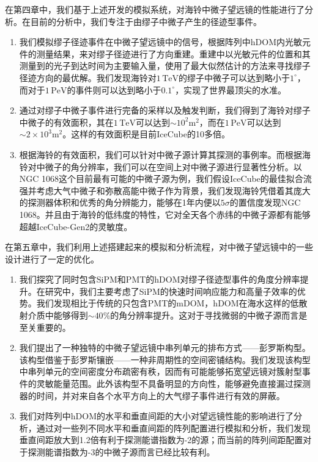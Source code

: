 在第四章中，我们基于上述开发的模拟系统，对海铃中微子望远镜的性能进行了分析。在目前的分析中，我们专注于由缪子中微子产生的径迹型事件。
\begin{enumerate}
    \item 我们模拟缪子径迹事件在中微子望远镜中的信号，根据阵列中hDOM内光敏元件的测量结果，来对缪子径迹进行了方向重建。重建中以光敏元件的位置和其测量到的光子到达时间为主要输入量，使用了最大似然估计的方法来寻找缪子径迹方向的最优解。我们发现海铃对$1\,\mathrm{TeV}$的缪子中微子可以达到略小于$1^\circ$，而对于$1\,\mathrm{PeV}$的事件则可以达到略小于$0.1^\circ$，实现了世界最顶尖的水准。
    \item 通过对缪子中微子事件进行完备的采样以及触发判断，我们得到了海铃对缪子中微子的有效面积，其在$1\,\mathrm{TeV}$可以达到$\sim 10^2 \mathrm{m^2}$，而在$1\,\mathrm{PeV}$可以达到$\sim 2 \times 10^3 \mathrm{m^2}$。这样的有效面积是目前IceCube的10多倍。
    \item 根据海铃的有效面积，我们可以针对中微子源计算其探测的事例率。而根据海铃对中微子的角分辨率，我们可以在空间上对中微子源进行显著性分析。以NGC 1068这个目前最有可能的中微子源为例，我们假设IceCube的最佳拟合流强并考虑大气中微子和弥散高能中微子作为背景，我们发现海铃凭借着其庞大的探测器体积和优秀的角分辨能力，能够在1年内便以$5\sigma$的置信度发现NGC 1068。并且由于海铃的低纬度的特性，它对全天各个赤纬的中微子源都有能够超越IceCube-Gen2的灵敏度。
\end{enumerate}

在第五章中，我们利用上述搭建起来的模拟和分析流程，对中微子望远镜中的一些设计进行了一定的优化。
\begin{enumerate}
    \item 我们探究了同时包含SiPM和PMT的hDOM对缪子径迹型事件的角度分辨率提升。在研究中，我们主要考虑了SiPM的快速时间响应能力和高量子效率的优势。我们发现相比于传统的只包含PMT的mDOM，hDOM在海水这样的低散射介质中能够得到$\sim 40\%$的角分辨率提升。这对于寻找微弱的中微子源而言是至关重要的。
    \item 我们提出了一种独特的中微子望远镜中串列单元的排布方式——彭罗斯构型。该构型借鉴于彭罗斯镶嵌——一种非周期性的空间密铺结构。我们发现该构型中串列单元的空间密度分布疏密有秩，因而有可能能够拓宽望远镜对簇射型事件的灵敏能量范围。此外该构型不具备明显的方向性，能够避免直接漏过探测器的时间，并对来自各个水平方向上的大气缪子事件进行有效的屏蔽。
    \item 我们对阵列中hDOM的水平和垂直间距的大小对望远镜性能的影响进行了分析，通过对一些列不同水平和垂直间距的阵列配置进行模拟和分析，我们发现垂直间距放大到1.2倍有利于探测能谱指数为-2的源；而当前的阵列间距配置对于探测能谱指数为-3的中微子源而言已经比较有利。
\end{enumerate}

